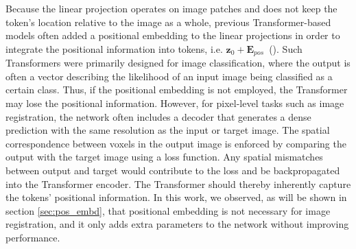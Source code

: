 \documentclass[times,twocolumn,final]{elsarticle}
\begin{document}
Because the linear projection operates on image patches and does not keep the token's location relative to the image as a whole, previous Transformer-based models often added a positional embedding to the linear projections in order to integrate the positional information into tokens, i.e. $\mathbf{z}_0 + \mathbf{E}_{pos}$~(\cite{vaswani2017attention, dosovitskiy2020image, liu2021swin, dong2021cswin}). Such Transformers were primarily designed for image classification, where the output is often a vector describing the likelihood of an input image being classified as a certain class. Thus, if the positional embedding is not employed, the Transformer may lose the positional information. However, for pixel-level tasks such as image registration, the network often includes a decoder that generates a dense prediction with the same resolution as the input or target image. The spatial correspondence between voxels in the output image is enforced by comparing the output with the target image using a loss function. Any spatial mismatches between output and target would contribute to the loss and be backpropagated into the Transformer encoder. The Transformer should thereby inherently capture the tokens' positional information. In this work, we observed, as will be shown in section \ref{sec:pos_embd}, that positional embedding is not necessary for image registration, and it only adds extra parameters to the network without improving performance.
\end{document}
